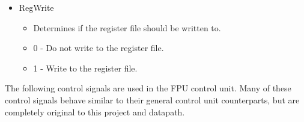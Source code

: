 \documentclass[
    paper=letter,
    parskip=half,
    fontsize=12pt,
    titlepage=firstiscover,
    toc=bibliography,
    numbers=endperiod
]{scrartcl}
\providecommand{\tightlist}{%
  \setlength{\itemsep}{0pt}\setlength{\parskip}{0pt}}
\begin{document}
\begin{itemize}
    \item RegWrite
          \begin{itemize}
              \tightlist
              \item Determines if the register file should be written to.
              \item 0 - Do not write to the register file.
              \item 1 - Write to the register file.
          \end{itemize}
\end{itemize}

The following control signals are used in the FPU control unit. Many of
these control signals behave similar to their general control unit
counterparts, but are completely original to this project and datapath.
\end{document}
